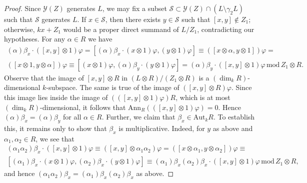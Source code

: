 \documentclass[11pt,a4paper]{amsart}
\theoremstyle{plain}
\theoremstyle{remark}
\newcommand{\tensor}{\otimes}
\begin{document}
\begin{proof}
Since $\mathcal{Y}(Z)$ generates $L$, we may fix a subset $\mathcal{S} \subset \mathcal{Y}(Z) \cap (L \setminus \gamma_2 L)$ such that $\mathcal{S}$ generates $L$.  If $x \in \mathcal{S}$, then there exists $y \in \mathcal{S}$ such that $[x,y] \not\in Z_1$; otherwise, $kx + Z_1$ would be a proper direct summand of $L/Z_1$, contradicting our hypotheses.  For any $\alpha \in R$ we have
\begin{multline} \label{equ:commutator}
(\alpha)\beta_x \cdot ([x,y] \otimes 1)\varphi = [(\alpha)\beta_x \cdot (x \tensor 1)\varphi, (y \tensor 1)\varphi]  \equiv ([x \otimes \alpha, y \otimes 1])\varphi = \\ ([x \otimes 1, y \otimes \alpha])\varphi \equiv [(x \tensor 1)\varphi, (\alpha)\beta_y \cdot (y \tensor 1)\varphi] = (\alpha) \beta_y \cdot ([x,y] \otimes 1) \varphi \, \mathrm{mod} \, Z_1 \otimes R.
\end{multline}
Observe that the image of $[x,y] \tensor R$ in $(L \tensor R)/(Z_1 \tensor R)$ is a $(\dim_k R)$-dimensional $k$-subspace.  The same is true of the image of $([x,y] \tensor R)\varphi$.  Since this image lies inside the image of $(([x,y] \tensor 1)\varphi)R$, which is at most $(\dim_k R)$-dimensional, it follows that $\mathrm{Ann}_R (([x,y] \tensor 1)\varphi) = 0$.  Hence $(\alpha)\beta_x = (\alpha)\beta_y$ for all $\alpha \in R$.
Further, we claim that $\beta_x \in \mathrm{Aut}_k R$.  To establish this, it remains only to show that $\beta_x$ is multiplicative.  Indeed, for $y$ as above and $\alpha_1, \alpha_2 \in R$, we see that
\begin{multline*} 
(\alpha_1 \alpha_2)\beta_x \cdot ([x,y] \otimes 1)\varphi \equiv ([x,y] \otimes \alpha_1 \alpha_2)\varphi = ([x \otimes \alpha_1, y \otimes \alpha_2])\varphi \equiv \\ [(\alpha_1)\beta_x \cdot (x \otimes 1)\varphi , (\alpha_2)\beta_x \cdot (y \otimes 1)\varphi] \equiv  (\alpha_1)\beta_x (\alpha_2)\beta_x \cdot  ([x,y] \otimes 1) \varphi \, \mathrm{mod} \, Z_1 \otimes R,
\end{multline*}
and hence $(\alpha_1 \alpha_2) \beta_x =  (\alpha_1)\beta_x  (\alpha_2)\beta_x$ as above.  


\end{proof}
\end{document}
